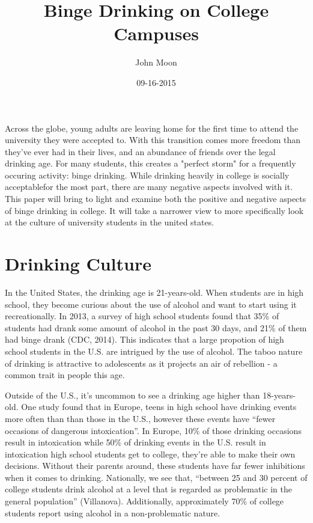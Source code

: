 \documentclass[12pt, man]{apa6}
\title{Binge Drinking on College Campuses}
\author{John Moon}
\affiliation{San Jose State University}
\date{09-16-2015}
\begin{document}
\maketitle

Across the globe, young adults are leaving home for the first time to attend the university they were accepted to. With this transition comes more freedom than they've ever had in their lives, and an abundance of friends over the legal drinking age. For many students, this creates a "perfect storm" for a frequently occuring activity: binge drinking. While drinking heavily in college is socially acceptablefor the most part, there are many negative aspects involved with it. This paper will bring to light and examine both the positive and negative aspects of binge drinking in college. It will take a narrower view to more specifically look at the culture of university students in the united states.

\section{Drinking Culture}
In the United States, the drinking age is 21-years-old. When students are in high school, they become curious about the use of alcohol and want to start using it recreationally. In 2013, a survey of high school students found that 35\% of students had drank some amount of alcohol in the past 30 days, and 21\% of them had binge drank (CDC, 2014). This indicates that a large propotion of high school students in the U.S. are intrigued by the use of alcohol. The taboo nature of drinking is attractive to adolescents as it projects an air of rebellion - a common trait in people this age.

Outside of the U.S., it's uncommon to see a drinking age higher than 18-years-old. One study found that in Europe, teens in high school have drinking events more often than than those in the U.S., however these events have ``fewer occasions of dangerous intoxication''. In Europe, 10\% of those drinking occasions result in intoxication while 50\% of drinking events in the U.S. result in intoxication high school students get to college, they're able to make their own decisions. Without their parents around, these students have far fewer inhibitions when it comes to drinking. Nationally, we see that, ``between 25 and 30 percent of college students drink alcohol at a level that is regarded as problematic in the general population'' (Villanova). Additionally, approximately 70\% of college students report using alcohol in a non-problematic nature.
\end{document}
